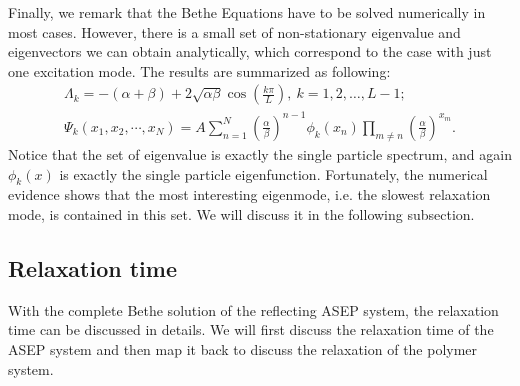 Finally, we remark that the Bethe Equations have to be solved numerically in most cases. However, there is a small set of non-stationary eigenvalue and eigenvectors we can obtain analytically, which correspond to the case with just one excitation mode. The results are summarized as following:  
\begin{subequations}
    \label{eq:eigenN}
    \begin{align}
        \label{eq:partEigenvaluesN}
        \Lambda_k  = -(\alpha+\beta) + 2\sqrt{\alpha\beta}\cos(\frac{k\pi}{L}), ~k=1,2,\dots, L-1; \\
        \label{eq:eigenvectorsN}
        \Psi_k(x_1, x_2, \cdots, x_N)  =  A \sum_{n=1}^N \left(\frac{\alpha}{\beta}\right)^{n-1} \phi_k(x_n)\prod_{m\neq n} \left(\frac{\alpha}{\beta}\right)^{x_m}.
    \end{align}
\end{subequations}
Notice that the set of eigenvalue is exactly the single particle spectrum, and again $\phi_k(x)$ is exactly the single particle eigenfunction.
Fortunately, the numerical evidence shows that the most interesting eigenmode, i.e. the slowest relaxation mode, is contained in this set.  We will discuss it in the following subsection. 

\subsection{Relaxation time}
\label{sub:relaxation_time}
With the complete Bethe solution of the reflecting ASEP system, the relaxation time can be discussed in details.
We will first discuss the relaxation time of the ASEP system and then map it back to discuss the relaxation of the polymer system. 


